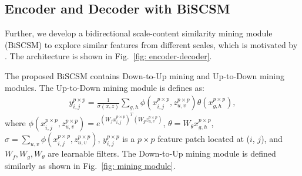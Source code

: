 \documentclass[letterpaper]{article} %
\begin{document}
\subsection{Encoder and Decoder with BiSCSM}\label{sec: Scale-content Similarity Mining}
%
Further, we develop a bidirectional scale-content similarity mining module (BiSCSM) to explore similar features from different scales, which
is motivated by \citet{Mei_sisr_mining,sr_cross_scale_mining_Mei}. The architecture is shown in Fig.~\ref{fig: encoder-decoder}.

The proposed BiSCSM contains Down-to-Up mining and Up-to-Down mining modules. The Up-to-Down mining module is defines as:
\begin{equation}
\begin{array}{ll}
y_{i,j}^{p \times p} = \frac{1}{\sigma(x,z)}\sum_{g,h} \phi(x^{p \times p}_{i,j},z^{p \times p}_{u,v}) \theta (x_{g,h}^{p \times p}) ,
\end{array}
\label{eq:n0}
\end{equation}
where $\phi(x^{p \times p}_{i,j},z^{p \times p}_{u,v}) = e^{(W_{f}x_{i,j}^{p \times p})^{T}(W_{g}z_{u,v}^{p \times p})}$,
$\theta = W_{\theta}x_{g,h}^{p \times p}$,
$\sigma = \sum_{u,v}\phi(x^{p \times p}_{i,j},z^{p \times p}_{u,v})$,
$y_{i,j}^{p \times p}$ is a $p \times p$ feature patch located at ($i$, $j$), and
$W_{f},W_{g},W_{\theta}$ are learnable filters.
The Down-to-Up mining module is defined similarly as shown in Fig.~\ref{fig: mining module}.
\end{document}
